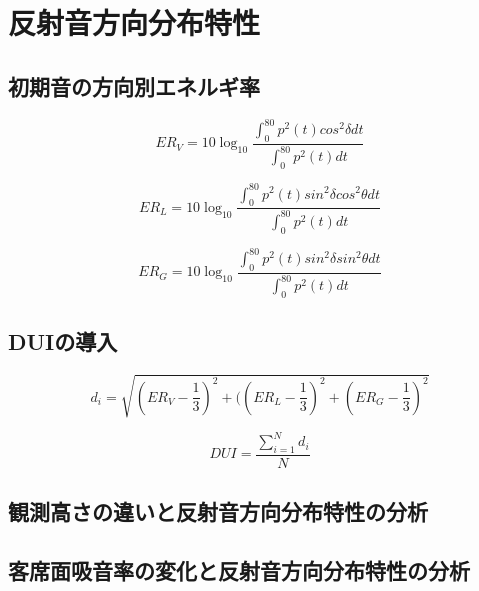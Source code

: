 \section{反射音方向分布特性}
\subsection{初期音の方向別エネルギ率}

\begin{equation}
  \label{eq:}
  ER_V = 10\log_{10}{\frac{\displaystyle\int_0^{80}p^2(t)cos^2{\delta}dt}{\displaystyle\int_0^{80}p^2(t)dt}} 
\end{equation}

\begin{equation}
  \label{eq:}
  ER_L = 10\log_{10}{\frac{\displaystyle\int_0^{80}p^2(t)sin^2{\delta}cos^2{\theta}dt}{\displaystyle\int_0^{80}p^2(t)dt}} 
\end{equation}

\begin{equation}
  \label{eq:}
  ER_G = 10\log_{10}{\frac{\displaystyle\int_0^{80}p^2(t)sin^2{\delta}sin^2{\theta}dt}{\displaystyle\int_0^{80}p^2(t)dt}} 
\end{equation}

\subsection{DUIの導入}

\begin{equation}
  \label{eq:}
  d_i = \sqrt{\left({ER_V-\frac{1}{3}}\right)^2 + (\left(ER_L-\frac{1}{3}\right)^2 + \left(ER_G-\frac{1}{3}\right)^2} 
\end{equation}

\begin{equation}
    \label{eq:}
    DUI=\frac{\sum_{i=1}^N{d_i}}{N}
\end{equation}

\subsection{観測高さの違いと反射音方向分布特性の分析}

\subsection{客席面吸音率の変化と反射音方向分布特性の分析}